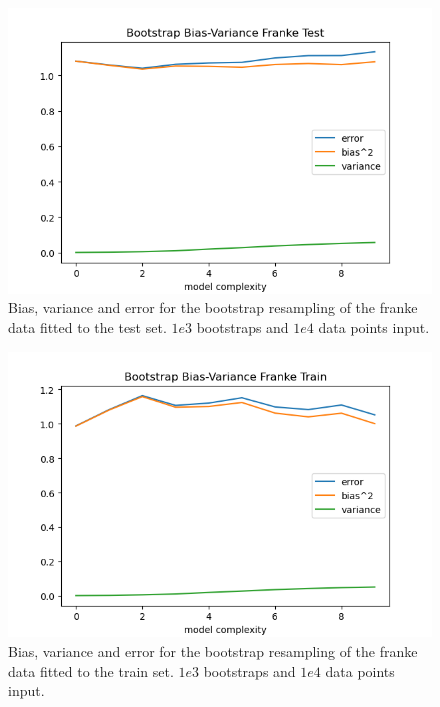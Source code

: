 \documentclass[15pt comic sans]{revtex4-2}
\begin{document}
\begin{figure}[hbtp]
\includegraphics[scale=0.7]{
	../plots/frankeBootstrapBiasVariancesigma1poly10boot1e3datapt1e4test.png}
\caption{
	Bias, variance and error for the bootstrap resampling of the franke data fitted to 
	the test set. $1e3$ bootstraps and $1e4$ data points input. 
	}
\label{fig:BootstrapBiasVariance1e4test}
\end{figure}

\begin{figure}[hbtp]
\includegraphics[scale=0.7]{
	../plots/frankeBootstrapBiasVariancesigma1poly10boot1e3datapt1e4train.png}
\caption{
	Bias, variance and error for the bootstrap resampling of the franke data fitted to 
	the train set. $1e3$ bootstraps and $1e4$ data points input. 
	}
\label{fig:BootstrapBiasVariance1e4train}
\end{figure}
\end{document}
